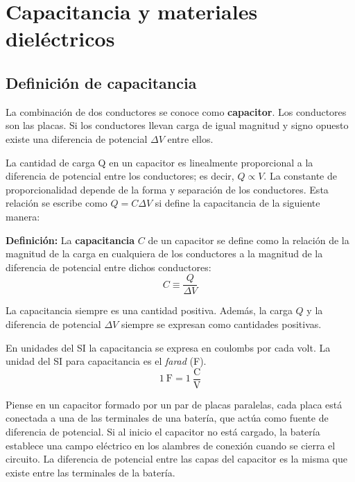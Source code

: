 \section{Capacitancia y materiales dieléctricos}
  \subsection{Definición de capacitancia}
    \PN La combinación de dos conductores se conoce como \textbf{capacitor}. Los conductores son las placas. Si los
    conductores llevan carga de igual magnitud y signo opuesto existe una diferencia de potencial $\Delta V$ entre
    ellos.

    \VS
    \PN La cantidad de carga Q en un capacitor es linealmente proporcional a la diferencia de potencial entre los
    conductores; es decir, $Q \propto V$. La constante de proporcionalidad depende de la forma y separación de los
    conductores. Esta relación se escribe como $Q = C \Delta V$ si define la capacitancia de la siguiente manera:

    \VS
    \PN \textbf{Definición:} La \textbf{capacitancia} $C$ de un capacitor se define como la relación de la magnitud de
    la carga en cualquiera de los conductores a la magnitud de la diferencia de potencial entre dichos conductores:
    \begin{equation*}
      C \equiv \frac{Q}{\Delta V}
    \end{equation*}

    \PN La capacitancia siempre es una cantidad positiva. Además, la carga $Q$ y la diferencia de potencial $\Delta V$
    siempre se expresan como cantidades positivas.

    \VS
    \PN En unidades del SI la capacitancia se expresa en coulombs por cada volt. La unidad del SI para capacitancia es
    el \textit{farad} (F).
    \begin{equation*}
      1 \ \text{F} = 1 \ \frac{\text{C}}{\text{V}}
    \end{equation*}

    \PN Piense en un capacitor formado por un par de placas paralelas, cada placa está conectada a una de las terminales
    de una batería, que actúa como fuente de diferencia de potencial. Si al inicio el capacitor no está cargado, la
    batería establece una campo eléctrico en los alambres de conexión cuando se cierra el circuito. La diferencia de
    potencial entre las capas del capacitor es la misma que existe entre las terminales de la batería.

